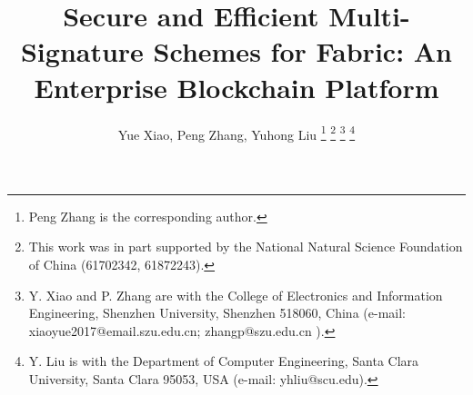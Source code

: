 \documentclass[journal]{IEEEtran}
\begin{document}
%
\title{Secure and Efficient Multi-Signature Schemes for Fabric: An Enterprise Blockchain Platform}
%
%
%

\author{Yue Xiao, Peng Zhang, Yuhong Liu%
\thanks{Peng Zhang is the corresponding author.}
\thanks{This work was in part supported by the National Natural Science Foundation of China (61702342, 61872243).}
\thanks{Y. Xiao and P. Zhang are with the College
of Electronics and Information Engineering, Shenzhen University, Shenzhen 518060, China (e-mail: xiaoyue2017@email.szu.edu.cn; zhangp@szu.edu.cn ).}%
\thanks{Y. Liu is with the Department of Computer Engineering, Santa Clara University, Santa Clara 95053, USA (e-mail: yhliu@scu.edu).}%
}

%
%
\end{document}
